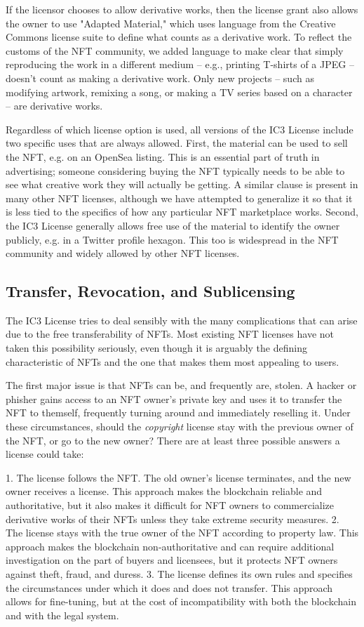 \documentclass{article}
\begin{document}
If the licensor chooses to allow derivative works, then the license grant also allows the owner to use "Adapted Material," which uses language from the Creative Commons license suite to define what counts as a derivative work. To reflect the customs of the NFT community, we added language to make clear that simply reproducing the work in a different medium -- e.g., printing T-shirts of a JPEG -- doesn't count as making a derivative work. Only new projects -- such as modifying artwork, remixing a song, or making a TV series based on a character -- are derivative works.

Regardless of which license option is used, all versions of the IC3 License include two specific uses that are always allowed. First, the material can be used to sell the NFT, e.g. on an OpenSea listing. This is an essential part of truth in advertising; someone considering buying the NFT typically needs to be able to see what creative work they will actually be getting. A similar clause is present in many other NFT licenses, although we have attempted to generalize it so that it is less tied to the specifics of how any particular NFT marketplace works. Second, the IC3 License generally allows free use of the material to identify the owner publicly, e.g. in a Twitter profile hexagon. This too is widespread in the NFT community and widely allowed by other NFT licenses.


\subsection{Transfer, Revocation, and Sublicensing}

The IC3 License tries to deal sensibly with the many complications that can arise due to the free transferability of NFTs. Most existing NFT licenses have not taken this possibility seriously, even though it is arguably the defining characteristic of NFTs and the one that makes them most appealing to users.

The first major issue is that NFTs can be, and frequently are, stolen. A hacker or phisher gains access to an NFT owner's private key and uses it to transfer the NFT to themself, frequently turning around and immediately reselling it. Under these circumstances, should the \emph{copyright} license stay with the previous owner of the NFT, or go to the new owner? There are at least three possible answers a license could take:

1. The license follows the NFT. The old owner's license terminates, and the new owner receives a license. This approach makes the blockchain reliable and authoritative, but it also makes it difficult for NFT owners to commercialize derivative works of their NFTs unless they take extreme security measures.
2. The license stays with the true owner of the NFT according to property law. This approach makes the blockchain non-authoritative and can require additional investigation on the part of buyers and licensees, but it protects NFT owners against theft, fraud, and duress.
3. The license defines its own rules and specifies the circumstances under which it does and does not transfer. This approach allows for fine-tuning, but at the cost of incompatibility with both the blockchain and with the legal system.
\end{document}

